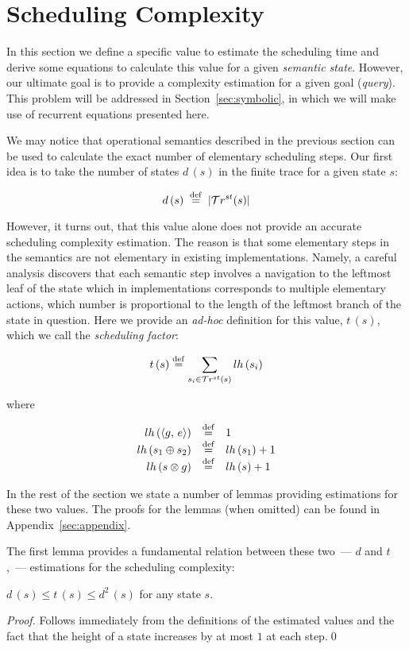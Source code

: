 \section{Scheduling Complexity}
\label{sec:scheduling}

In this section we define a specific value to estimate the scheduling time and derive some equations to calculate this value for a given \emph{semantic
state}. However, our ultimate goal is to provide a complexity estimation for a given goal (\emph{query}). This problem will be addressed in Section~\ref{sec:symbolic},
in which we will make use of recurrent equations presented here.

We may notice that operational semantics described in the previous section can be used to calculate the exact number of elementary scheduling steps.
Our first idea is to take the number of states $d\,(s)$ in the finite trace for a given state $s$:

\[ d\,(s) \; \overset{\mathrm{def}}{=} \; | \mathcal{T}r^{st}(s) |  \]

However, it turns out, that this value alone does not provide an accurate scheduling complexity estimation. The reason is that some
elementary steps in the semantics are not elementary in existing implementations. Namely, a careful analysis discovers that
each semantic step involves a navigation to the leftmost leaf of the state which in implementations corresponds to multiple elementary actions,
which number is proportional to the length of the leftmost branch of the state in question. Here we provide an \emph{ad-hoc} definition for this value, $t\,(s)$,
which we call the \emph{scheduling factor}:
{ \color{orange}
\[
t\,(s) \overset{\mathrm{def}}{=} \sum\limits_{s_i \in \mathcal{T}r^{st}(s)} lh\,(s_i) 
\]

where

\[
\begin{array}{rcl}
 lh\,(\langle g ,\, e \rangle)  &\overset{\mathrm{def}}{=}& 1 \\
 lh\,(s_1 \oplus s_2) &\overset{\mathrm{def}}{=}& lh\,(s_1) + 1 \\
 lh\,(s \otimes g)    &\overset{\mathrm{def}}{=}& lh\,(s) + 1 \\
\end{array}
\]
}
In the rest of the section we state a number of lemmas providing estimations for these two values. The proofs for the lemmas (when omitted) can be
found in Appendix~\ref{sec:appendix}.
{ \color{orange}
The first lemma provides a fundamental relation between these two~--- $d$ and $t$,~--- estimations for the scheduling complexity:

\begin{lemma}
\label{lem:d_t_relation}
 $d\,(s) \le t\,(s) \le d^2\,(s)$ for any state $s$.
\end{lemma} }
{ \color{red}
\begin{proof}
  Follows immediately from the definitions of the estimated values and the fact that the height of a state increases by at most $1$ at each step.\qed
\end{proof}
}

